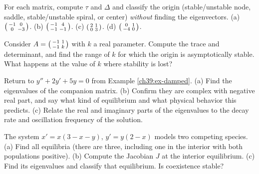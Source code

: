 \begin{exercise}
For each matrix, compute $\tau$ and $\Delta$ and classify the origin
(stable/unstable node, saddle, stable/unstable spiral, or center) \emph{without}
finding the eigenvectors. (a) $\begin{psmallmatrix} -1 & 0 \\ 0 &
-3\end{psmallmatrix}$. (b) $\begin{psmallmatrix} -1 & 4 \\ -1 &
-1\end{psmallmatrix}$. (c) $\begin{psmallmatrix} 2 & 1 \\ 0 &
3\end{psmallmatrix}$. (d) $\begin{psmallmatrix} 0 & 1 \\ -4 &
0\end{psmallmatrix}$.
\end{exercise}

\begin{exercise}
Consider $A = \begin{psmallmatrix} -1 & 1 \\ -1 & k\end{psmallmatrix}$ with $k$
a real parameter. Compute the trace and determinant, and find the range of $k$
for which the origin is asymptotically stable. What happens at the value of $k$
where stability is lost?
\end{exercise}

\begin{exercise}
Return to $y'' + 2y' + 5y = 0$ from Example \ref{ch39:ex-damped}. (a) Find the
eigenvalues of the companion matrix. (b) Confirm they are complex with negative
real part, and say what kind of equilibrium and what physical behavior this
predicts. (c) Relate the real and imaginary parts of the eigenvalues to the decay
rate and oscillation frequency of the solution.
\end{exercise}

\begin{exercise}
The system $x' = x(3 - x - y)$, $y' = y(2 - x)$ models two competing species.
(a) Find all equilibria (there are three, including one in the interior with both
populations positive). (b) Compute the Jacobian $J$ at the interior equilibrium.
(c) Find its eigenvalues and classify that equilibrium. Is coexistence stable?
\end{exercise}

